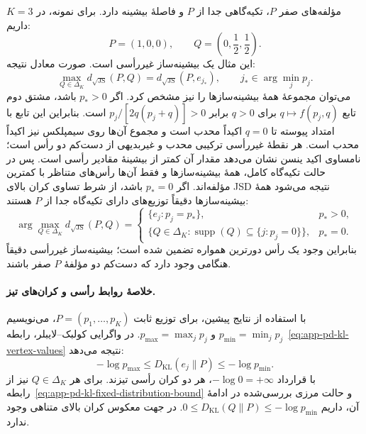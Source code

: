 مؤلفه‌های صفر $P$، تکیه‌گاهی جدا از $P$
و فاصلهٔ بیشینه دارد.
برای نمونه، در $K=3$ داریم:
\[
P=(1,0,0),\qquad
Q=\left(0,\frac12,\frac12\right).
\]
این مثال یک بیشینه‌ساز غیررأسی است.
صورت معادل نتیجه:
\begin{equation}\label{cmp:eq:ch3-js-farthest-vertex}
\max_{Q\in\Delta_K}d_{\sqrt{\mathrm{JS}}}(P,Q)
=d_{\sqrt{\mathrm{JS}}}(P,e_{j_*}),\qquad
j_*\in\arg\min_jp_j.
\end{equation}
می‌توان مجموعهٔ همهٔ بیشینه‌سازها را نیز مشخص کرد. اگر $p_*>0$ باشد، مشتق دوم تابع $q\mapsto f(p_j,q)$ برای $q>0$ برابر $p_j/[2q(p_j+q)]>0$ است. بنابراین این تابع با امتداد پیوسته تا $q=0$ اکیداً محدب است و مجموع آن‌ها روی سیمپلکس نیز اکیداً محدب است. هر نقطهٔ غیررأسی ترکیبی محدب و غیربدیهی از دست‌کم دو رأس است؛ نامساوی اکید ینسن نشان می‌دهد مقدار آن کمتر از بیشینهٔ مقادیر رأسی است. پس در حالت تکیه‌گاه کامل، همهٔ بیشینه‌سازها و فقط آن‌ها رأس‌های متناظر با کمترین مؤلفه‌اند. اگر $p_*=0$ باشد، از شرط تساوی کران بالای JSD نتیجه می‌شود همهٔ بیشینه‌سازها دقیقاً توزیع‌های دارای تکیه‌گاه جدا از $P$ هستند:
\begin{equation}\label{eq:app-pd-all-maximizers}
\arg\max_{Q\in\Delta_K}d_{\sqrt{\mathrm{JS}}}(P,Q)
=
\begin{cases}
\{e_j:p_j=p_*\},&p_*>0,\\
\{Q\in\Delta_K:\operatorname{supp}(Q)\subseteq\{j:p_j=0\}\},&p_*=0.
\end{cases}
\end{equation}
بنابراین وجود یک رأس دورترین همواره تضمین شده است؛ بیشینه‌ساز غیررأسی دقیقاً هنگامی وجود دارد که دست‌کم دو مؤلفهٔ $P$ صفر باشند.

\paragraph{خلاصهٔ روابط رأسی و کران‌های تیز.}
با استفاده از نتایج پیشین، برای توزیع ثابت
$P=(p_1,\ldots,p_K)$، می‌نویسیم
$p_{\min}=\min_jp_j$ و $p_{\max}=\max_jp_j$.
در واگرایی کولبک--لایبلر، رابطه~\eqref{eq:app-pd-kl-vertex-values}
نتیجه می‌دهد:
\begin{equation}\label{cmp:eq:ch3-kl-vertex-bounds}
-\log p_{\max}\le D_{\mathrm{KL}}(e_j\|P)
\le-\log p_{\min}.
\end{equation}
با قرارداد $-\log0=+\infty$، هر دو کران رأسی تیزند.
برای هر $Q\in\Delta_K$ نیز از
رابطه~\eqref{eq:app-pd-kl-fixed-distribution-bound}
و حالت مرزی بررسی‌شده در ادامهٔ آن، داریم
$0\le D_{\mathrm{KL}}(Q\|P)\le-\log p_{\min}$.
در جهت معکوس کران بالای متناهی وجود ندارد.

